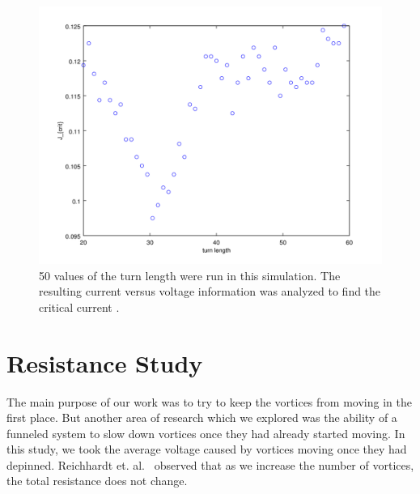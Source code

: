 \begin{figure}[htbp]
\begin{center}
\includegraphics[scale=.50]{kinkScan.png}
\caption{ 50 values of the turn length were run in this simulation. The resulting current versus voltage information was analyzed to find the critical current .  }
\label{normalYscan}
\end{center}
\end{figure}

\section{Resistance Study}
The main purpose of our work was to try to keep the vortices from moving in the first place. But another area of research which we explored was the ability of a funneled system to slow down vortices once they had already started moving. In this study, we took the average voltage caused by vortices moving once they had depinned. Reichhardt et. al.~\cite{Reichhardt10} observed that as we increase the number of vortices, the total resistance does not change.

